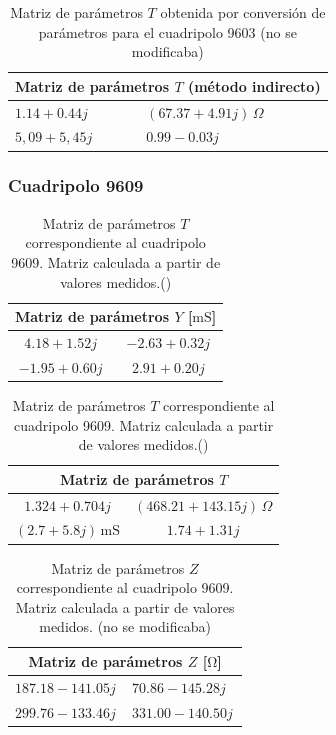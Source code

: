 \begin{table}[H]
\centering
\begin{tabular}{|l|l|}
\hline
\multicolumn{2}{|c|}{\textbf{Matriz de parámetros $T$ (método indirecto)}} \\ \hline
$1.14 + 0.44j$ & $(67.37 + 4.91j)\,\Omega$ \\ \hline
$5,09 + 5,45j$ & $0.99 - 0.03j$ \\ \hline
\end{tabular}
\caption{Matriz de parámetros $T$ obtenida por conversión de parámetros para el cuadripolo 9603 (no se modificaba)}
\label{tab:matriz_T9603_indirecta}
\end{table}
	
	\subsubsection{Cuadripolo 9609}
	

\begin{table}[H]
\centering
\begin{minipage}{0.48\textwidth}
\centering
\begin{tabular}{|c|c|}
\hline
\multicolumn{2}{|c|}{\textbf{Matriz de parámetros $Y$ [$\mathrm{mS}$]}} \\ \hline
$4.18 + 1.52j\,$ & $-2.63 + 0.32j\,$ \\ \hline
$-1.95 + 0.60j\,$ & $2.91 + 0.20j\,$ \\ \hline
\end{tabular}
\caption{Matriz de parámetros $Y$ correspondiente al cuadripolo 9609. Matriz calculada a partir de valores medidos.()}
\label{tab:matriz_Y_9609}
\end{minipage}
\hfill
\begin{minipage}{0.48\textwidth}
\centering
\begin{tabular}{|c|c|}
\hline
\multicolumn{2}{|c|}{\textbf{Matriz de parámetros $T$}} \\ \hline
$1.324 + 0.704j$ & $(468.21 + 143.15j)\,\Omega$ \\ \hline
$(2.7 + 5.8j)\,\mathrm{mS}$ & $1.74 + 1.31j$ \\ \hline
\end{tabular}
\caption{Matriz de parámetros $T$ correspondiente al cuadripolo 9609. Matriz calculada a partir de valores medidos.()}
\label{tab:matriz_T_9609}
\end{minipage}
\end{table}

\begin{table}[H]
\centering
\begin{tabular}{|l|l|}
\hline
\multicolumn{2}{|c|}{\textbf{Matriz de parámetros $Z$ [$\mathrm{\Omega}$]}} \\ \hline
$187.18 - 141.05j\,$ & $70.86 - 145.28j\,$ \\ \hline
$299.76 - 133.46j\, $ & $331.00 - 140.50j\,$ \\ \hline
\end{tabular}
\caption{Matriz de parámetros $Z$ correspondiente al cuadripolo 9609. Matriz calculada a partir de valores medidos. (no se modificaba)}
\label{tab:matriz_Z9609}
\end{table}

